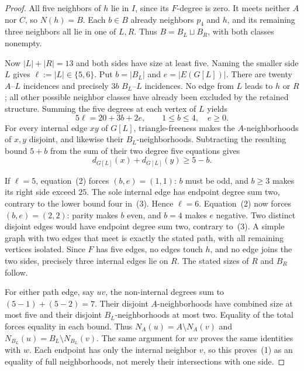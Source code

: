 \documentclass[11pt]{article}
\begin{document}
\begin{proof}
All five neighbors of $h$ lie in $I$, since its $F$-degree is zero.
It meets neither $A$ nor $C$, so $N(h)=B$. Each $b\in B$ already
neighbors $p_4$ and $h$, and its remaining three neighbors all lie in
one of $L,R$. Thus $B=B_L\sqcup B_R$, with both classes nonempty.

Now $|L|+|R|=13$ and both sides have size at least five. Naming the
smaller side $L$ gives $\ell:=|L|\in\{5,6\}$. Put $b=|B_L|$ and
$e=|E(G[L])|$. There are twenty $A$--$L$ incidences and precisely $3b$
$B_L$--$L$ incidences. No edge from $L$ leads to $h$ or $R$; all other
possible neighbor classes have already been excluded by the retained
structure. Summing the five degrees at each vertex of $L$ yields
\[
 5\ell=20+3b+2e,\qquad 1\leq b\leq4,\quad e\geq0.           \tag{2}
\]
For every internal edge $xy$ of $G[L]$, triangle-freeness makes the
$A$-neighborhoods of $x,y$ disjoint, and likewise their $B_L$-neighborhoods.
Subtracting the resulting bound $5+b$ from the sum of their two degree
five equations gives
\[
 d_{G[L]}(x)+d_{G[L]}(y)\geq5-b.                              \tag{3}
\]

If $\ell=5$, equation~(2) forces $(b,e)=(1,1)$: $b$ must be odd,
and $b\geq3$ makes its right side exceed $25$. The sole internal edge
has endpoint degree sum two, contrary to the lower bound four in~(3).
Hence $\ell=6$. Equation~(2) now forces $(b,e)=(2,2)$: parity makes
$b$ even, and $b=4$ makes $e$ negative. Two distinct disjoint edges
would have endpoint degree sum two, contrary to~(3). A simple graph
with two edges that meet is exactly the stated path, with all remaining
vertices isolated. Since $F$ has five edges, no edges touch $h$, and no
edge joins the two sides, precisely three internal edges lie on $R$.
The stated sizes of $R$ and $B_R$ follow.

For either path edge, say $uv$, the non-internal degrees sum to
$(5-1)+(5-2)=7$. Their disjoint $A$-neighborhoods have combined size
at most five and their disjoint $B_L$-neighborhoods at most two. Equality
of the total forces equality in each bound. Thus $N_A(u)=A\setminus
N_A(v)$ and $N_{B_L}(u)=B_L\setminus N_{B_L}(v)$. The same argument
for $wv$ proves the same identities with $w$. Each endpoint has only
the internal neighbor $v$, so this proves~(1) as an equality of full
neighborhoods, not merely their intersections with one side.
\end{proof}
\end{document}
